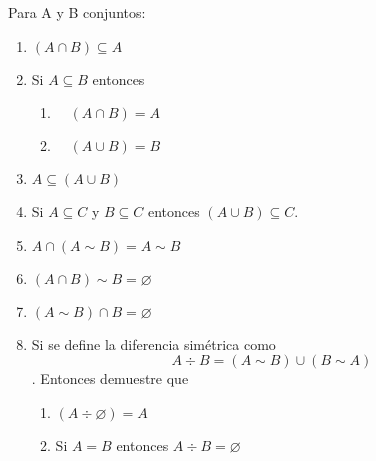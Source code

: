 





	
Para A y B conjuntos:
\begin{enumerate}
	\item $(A \cap B) \subseteq A$
	\item Si $A \subseteq B$ entonces 
	\begin{enumerate}
		\item  $\quad(A \cap B)=A$
		\item $\quad(A \cup B)=B$
	\end{enumerate}
	\item $A \subseteq(A \cup B)$
	\item Si $A \subseteq C$ y $B \subseteq C$ entonces $(A \cup B) \subseteq C$.
	\item $ A \cap(A \sim B)=A \sim B$
	\item $(A \cap B) \sim B=\varnothing$
	\item $(A \sim B) \cap B=\varnothing$
	\item Si se define la diferencia simétrica como $$A \div B=(A \sim B) \cup(B \sim A)$$.
	Entonces demuestre que
	\begin{enumerate}
		\item $(A \div \varnothing)=A$
		\item  Si $A=B$ entonces $A \div B=\varnothing$
	\end{enumerate}
\end{enumerate}





